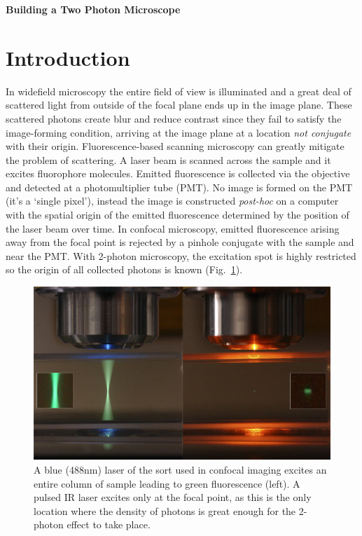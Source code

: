 \documentclass[a4paper]{report}
\begin{document}
\setcounter{secnumdepth}{2}

\begin{center}
\textbf{\Large{Building a Two Photon Microscope}}
\end{center}

\section{Introduction}

In widefield microscopy the entire field of view is illuminated and a great deal of scattered light from outside of the focal plane ends up in the image plane. 
These scattered photons create blur and reduce contrast since they fail to satisfy the image-forming condition, arriving at the image plane at a location \textit{not conjugate} with their origin.
Fluorescence-based scanning microscopy can greatly mitigate the problem of scattering. 
A laser beam is scanned across the sample and it excites fluorophore molecules. 
Emitted fluorescence is collected via the objective and detected at a photomultiplier tube (PMT). 
No image is formed on the PMT (it's a `single pixel'), instead the image is constructed \textit{post-hoc} on a computer with the spatial origin of the emitted fluorescence determined by the position of the laser beam over time.
In confocal microscopy, emitted fluorescence arising away from the focal point is rejected by a pinhole conjugate with the sample and near the PMT. 
With 2-photon microscopy, the excitation spot is highly restricted so the origin of all collected photons is known (Fig.~\ref{1pvs2p}). 

\begin{figure}[h]
\centering
\includegraphics[width=4.5in]{1Pvs2PFluorescence.png}
\caption{A blue (488nm) laser of the sort used in confocal imaging excites an entire column of sample leading to green fluorescence (left).
A pulsed IR laser excites only at the focal point, as this is the only location where the density of photons is great enough for the 2-photon effect to take place.}
\label{1pvs2p}
\end{figure}
\end{document}

